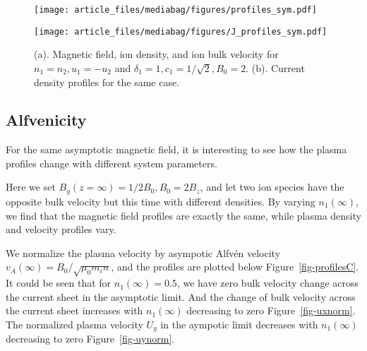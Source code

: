 \documentclass[
  letterpaper,
  DIV=11,
  numbers=noendperiod]{scrartcl}
\begin{document}
\begin{figure}

\begin{minipage}{0.50\linewidth}
\texttt{[image: article\_files/mediabag/figures/profiles\_sym.pdf]}\end{minipage}%
%
\begin{minipage}{0.50\linewidth}
\texttt{[image: article\_files/mediabag/figures/J\_profiles\_sym.pdf]}\end{minipage}%

\caption{\label{fig-profiles}(a). Magnetic field, ion density, and ion bulk velocity for \(n_1 = n_2, u_1 = -u_2\) and \(δ_1=1, c_1=1/\sqrt{2}, B_0 = 2\). (b). Current density profiles for the same case.}

\end{figure}%

\subsection{Alfvenicity}\label{alfvenicity}

For the same asymptotic magnetic field, it is interesting to see how the plasma profiles change with different system parameters.

Here we set \(B_y(z=\infty) = 1/2 B_0, B_0 = 2 B_z\), and let two ion species have the opposite bulk velocity but this time with different densities. By varying \(n_1(∞)\), we find that the magnetic field profiles are exactly the same, while plasma density and velocity profiles vary.

We normalize the plasma velocity by asympotic Alfvén velocity \(v_{A}(∞) = B_0 / \sqrt{\mu_0 m_i n}\), and the profiles are plotted below Figure~\ref{fig-profilesC}. It could be seen that for \(n_1(∞) = 0.5\), we have zero bulk velocity change across the current sheet in the asymptotic limit. And the change of bulk velocity across the current sheet increases with \(n_1(∞)\) decreasing to zero Figure~\ref{fig-uxnorm}. The normalized plasma velocity \(U_y\) in the aympotic limit decreases with \(n_1(∞)\) decreasing to zero Figure~\ref{fig-uynorm}.
\end{document}
